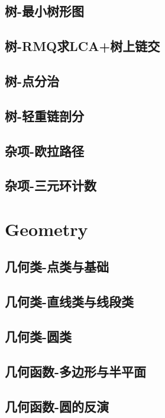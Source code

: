 \documentclass[UTF8]{ctexart}
\begin{document}
\begin{CJK}{UTF8}{<font>}
\begin{spacing}{0.80}
\subsection{树-最小树形图} 
\subsection{树-RMQ求LCA+树上链交} 
\subsection{树-点分治} 
\subsection{树-轻重链剖分} 
\subsection{杂项-欧拉路径} 
\subsection{杂项-三元环计数} 
\section{Geometry}
\subsection{几何类-点类与基础} 
\subsection{几何类-直线类与线段类} 
\subsection{几何类-圆类} 
\subsection{几何函数-多边形与半平面} 
\subsection{几何函数-圆的反演} 

\end{spacing}
\end{CJK}
\end{document}
